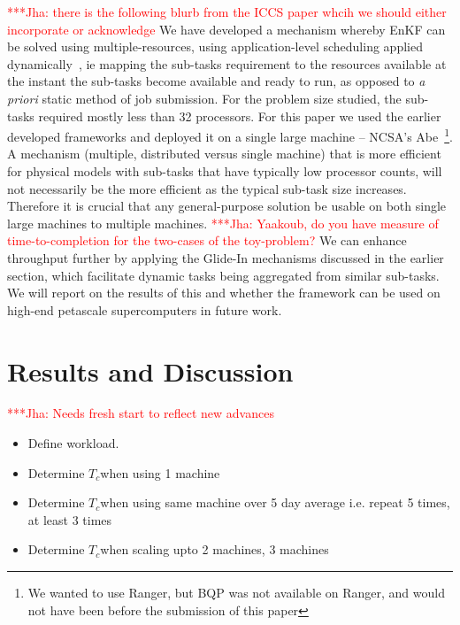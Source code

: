 \documentclass[conference,final]{IEEEtran}
\newcommand{\tc}{$T_c$}
\newcommand{\jhanote}[1]{ {\textcolor{red} { ***Jha: #1 }}}
\begin{document}
\jhanote{there is the following blurb from the ICCS paper whcih we
  should either incorporate or acknowledge} We have developed a
mechanism whereby EnKF can be solved using multiple-resources, using
application-level scheduling applied dynamically~\cite{saga_tg08}, ie
mapping the sub-tasks requirement to the resources available at the
instant the sub-tasks become available and ready to run, as opposed to
{\it a priori} static method of job submission.  For the problem size
studied, the sub-tasks required mostly less than 32 processors. For
this paper we used the earlier developed frameworks and deployed it on
a single large machine -- NCSA's Abe~\footnote{We wanted to use
  Ranger, but BQP was not available on Ranger, and would not have been
  before the submission of this paper}.  A mechanism (multiple,
distributed versus single machine) that is more efficient for physical
models with sub-tasks that have typically low processor counts, will
not necessarily be the more efficient as the typical sub-task size
increases. Therefore it is crucial that any general-purpose solution
be usable on both single large machines to multiple machines.
\jhanote{Yaakoub, do you have measure of time-to-completion for the
  two-cases of the toy-problem?}  We can enhance throughput further by
applying the Glide-In mechanisms discussed in the earlier section,
which facilitate dynamic tasks being aggregated from similar
sub-tasks. We will report on the results of this and whether the
framework can be used on high-end petascale supercomputers in future
work.


\section{Results and Discussion}

\jhanote{Needs fresh start to reflect new advances}

\begin{itemize}
\item Define workload.
\item Determine  \tc when using 1 machine 
\item Determine \tc when using same machine over 5 day average i.e. repeat 5 times, at least 3 times
\item Determine \tc when scaling upto 2 machines, 3 machines 
\end{itemize}
\end{document}

